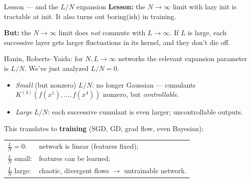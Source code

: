 \documentclass[11pt]{beamer}
\newcommand{\hl}[1]{{\color{blue!60!black}\textbf{#1}}}
\begin{document}
\begin{frame}{Lesson --- and the $L/N$ expansion}
  \hl{Lesson:} the $N\to\infty$ limit with lazy init is tractable at
  init. It also turns out boring(ish) in training.  \pause
  \vspace{1mm}

  \hl{But:} the $N\to\infty$ limit does \emph{not} commute with
  $L\to\infty$. If $L$ is large, each successive layer gets larger
  fluctuations in its kernel, and they don't die off. \pause
  \vspace{1mm}

  Hanin, Roberts--Yaida: for $N, L \to\infty$ networks the relevant
  expansion parameter is $\boxed{L/N}$. We've just analyzed $L/N = 0$. \pause
  \begin{itemize}
    \item \emph{Small} (but nonzero) $L/N$: no longer Gaussian ---
      cumulants $K^{(4)}(f(x^1), \dots, f(x^4))$ nonzero, but
      \emph{controllable}.
    \item \emph{Large} $L/N$: each successive cumulant is even larger;
      uncontrollable outputs.
  \end{itemize} \pause
  \vspace{1mm}

  This translates to \hl{training} (SGD, GD, grad flow, even Bayesian):
  \begin{center}
  \begin{tabular}{ll}
    $\tfrac LN = 0$: & network is linear (features fixed); \\
    $\tfrac LN$ small: & features can be learned; \\
    $\tfrac LN$ large: & chaotic, divergent flows $\to$ untrainable network.
  \end{tabular}
  \end{center}
\end{frame}
\end{document}
